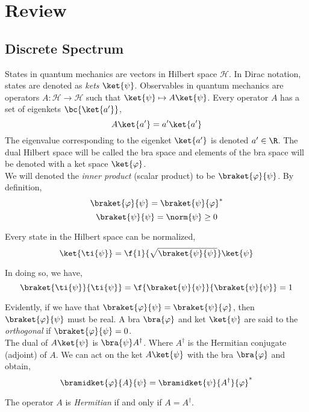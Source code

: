 \documentclass{article}
\newcommand{\hilb}{\mathcal{H}}
\begin{document}
\titlePage

\tableOfContents

\disclaimer

\section{Review}

\subsection{Discrete Spectrum}
States in quantum mechanics are vectors in Hilbert space $\hilb$. In Dirac notation, states are denoted as \textit{kets} $\ket{\psi}$. Observables in quantum mechanics are operators $A : \hilb \to \hilb$ such that $\ket{\psi} \mapsto A \ket{\psi}$. Every operator $A$ has a set of eigenkets $\bc{\ket{a'}}$,
\[ A \ket{a'} = a' \ket{a'} \]
The eigenvalue corresponding to the eigenket $\ket{a'}$ is denoted $a' \in \R$. The dual Hilbert space will be called the bra space and elements of the bra space will be denoted with a ket space $\ket{\varphi}$.\\

We will denoted the \textit{inner product} (scalar product) to be $\braket{\varphi}{\psi}$. By definition,
\[ \braket{\varphi}{\psi} = \braket{\psi}{\varphi}^{*} \]
\[ \braket{\psi}{\psi} = \norm{\psi} \geq 0 \]

Every state in the Hilbert space can be normalized,
\[ \ket{\ti{\psi}} = \f{1}{\sqrt{\braket{\psi}{\psi}}} \ket{\psi} \]

In doing so, we have,
\[ \braket{\ti{\psi}}{\ti{\psi}} = \f{\braket{\psi}{\psi}}{\braket{\psi}{\psi}} = 1 \]

Evidently, if we have that $\braket{\varphi}{\psi} = \braket{\psi}{\varphi}$, then $\braket{\varphi}{\psi}$ must be real. A bra $\bra{\varphi}$ and ket $\ket{\psi}$ are said to the \textit{orthogonal} if $\braket{\varphi}{\psi} = 0$. \\

The dual of $A \ket{\psi}$ is $\bra{\psi} A^\dagger$. Where $A^{\dagger}$ is the Hermitian conjugate (adjoint) of $A$. We can act on the ket $A\ket{\psi}$ with the bra $\bra{\varphi}$ and obtain,
\[ \bramidket{\varphi}{A}{\psi} = \bramidket{\psi}{A^\dagger}{\varphi}^{*} \]

The operator $A$ is \textit{Hermitian} if and only if $A = A^{\dagger}$. \\
\end{document}

